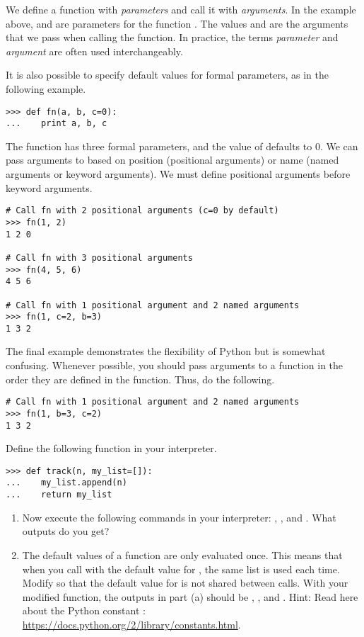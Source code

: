 We define a function with \emph{parameters} and call it with \emph{arguments}.
In the example above,  and  are parameters for the function . The values  and  are the arguments that we pass when calling the function. In practice, the terms \emph{parameter} and \emph{argument} are often used interchangeably.

It is also possible to specify default values for formal parameters, as in the following example.
\begin{lstlisting}
>>> def fn(a, b, c=0):
...    print a, b, c
\end{lstlisting}
The function  has three formal parameters, and the value of  defaults to 0.
We can pass arguments to  based on position (positional arguments) or name (named arguments or keyword arguments). We must define positional arguments before keyword arguments.
\begin{lstlisting}
# Call fn with 2 positional arguments (c=0 by default)
>>> fn(1, 2)
1 2 0

# Call fn with 3 positional arguments
>>> fn(4, 5, 6)
4 5 6

# Call fn with 1 positional argument and 2 named arguments
>>> fn(1, c=2, b=3)
1 3 2
\end{lstlisting}
The final example demonstrates the flexibility of Python but is somewhat confusing. Whenever possible, you should pass arguments to a function in the order they are defined in the function. Thus, do the following.
\begin{lstlisting}
# Call fn with 1 positional argument and 2 named arguments
>>> fn(1, b=3, c=2)
1 3 2
\end{lstlisting}



\begin{problem}
Define the following function in your interpreter.
\begin{lstlisting}
>>> def track(n, my_list=[]):
...    my_list.append(n)
...    return my_list
\end{lstlisting}
\begin{enumerate}
\item Now execute the following commands in your interpreter: , ,  and  . What outputs do you get?
\item The default values of a function are only evaluated once.
This means that when you call  with the default value for , the same list is used each time.
Modify  so that the default value for  is not shared between calls.
With your modified function, the outputs in part (a) should be \li{[1]}, \li{[2]}, \li{[3]} and \li{[1, 2, 3, 1]}. Hint: Read here about the Python constant : \url{https://docs.python.org/2/library/constants.html}.
\end{enumerate}
\end{problem}

